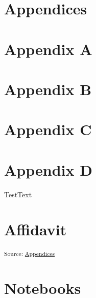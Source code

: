 \documentclass[12pt,a4paper]{book}      %
\begin{document}
\label{refs}

\chapter{}\label{section-5}

\chapter{Appendices}\label{appendices}

\chapter{Appendix A}\label{appendix-a}

\chapter{Appendix B}\label{appendix-b}

\chapter{Appendix C}\label{appendix-c}

\chapter{Appendix D}\label{appendix-d}

TestText

\chapter{Affidavit}\label{affidavit}

\textsubscript{Source:
\href{https://VJMeyer.github.io/submission/chapters/Appendices.qmd.html\#7b34ca3e-6a0a-4856-b99b-06c7c16c11c8}{Appendices}}

\chapter{Notebooks}\label{notebooks}
\end{document}
